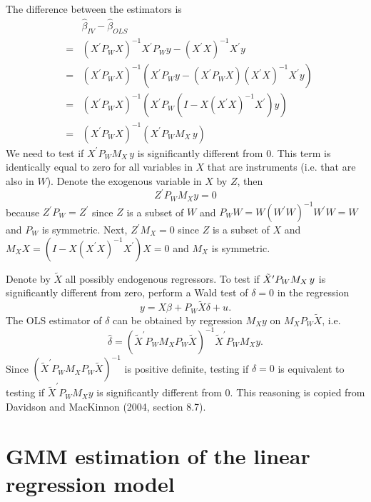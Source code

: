 \documentclass{article}
\begin{document}
The difference between the estimators is%
\begin{eqnarray*}
&&\hat{\beta}_{IV}-\hat{\beta}_{OLS} \\
&=&\left( X^{\prime }P_{W}X\right) ^{-1}X^{\prime }P_{W}y-\left( X^{\prime
}X\right) ^{-1}X^{\prime }y \\
&=&\left( X^{\prime }P_{W}X\right) ^{-1}\left( X^{\prime }P_{W}y-\left(
X^{\prime }P_{W}X\right) \left( X^{\prime }X\right) ^{-1}X^{\prime }y\right)
\\
&=&\left( X^{\prime }P_{W}X\right) ^{-1}\left( X^{\prime }P_{W}\left(
I-X\left( X^{\prime }X\right) ^{-1}X^{\prime }\right) y\right) \\
&=&\left( X^{\prime }P_{W}X\right) ^{-1}\left( X^{\prime
}P_{W}M_{X}\,y\right)
\end{eqnarray*}%
We need to test if $X^{\prime }P_{W}M_{X}\,y$ is significantly different
from 0. This term is identically equal to zero for all variables in $X$ that
are instruments (i.e. that are also in $W$). Denote the exogenous variable
in $X$ by $Z$, then%
\begin{equation*}
Z^{\prime }P_{W}M_{X}y=0
\end{equation*}%
because $Z^{\prime }P_{W}=Z^{\prime }$ since $Z$ is a subset of $W$ and $%
P_{W}W=W\left( W^{\prime }W\right) ^{-1}W^{\prime }W=W$ and $P_{W}$ is
symmetric. Next, $Z^{\prime }M_{X}=0$ since $Z$ is a subset of $X$ and $%
M_{X}X=\left( I-X\left( X^{\prime }X\right) ^{-1}X^{\prime }\right) X=0$ and
$M_{X}$ is symmetric.

Denote by $\tilde{X}$ all possibly endogenous regressors. To test if $\tilde{%
X}^{\prime }P_{W}M_{X}\,y$ is significantly different from zero, perform a
Wald test of $\delta =0$ in the regression%
\begin{equation*}
y=X\beta +P_{W}\tilde{X}\delta +u.
\end{equation*}%
The OLS estimator of $\delta $ can be obtained by regression $M_{X}y$ on $%
M_{X}P_{W}\tilde{X}$, i.e.%
\begin{equation*}
\hat{\delta}=\left( \tilde{X}^{\prime }P_{W}M_{X}P_{W}\tilde{X}\right) ^{-1}%
\tilde{X}^{\prime }P_{W}M_{X}y.
\end{equation*}%
Since $\left( \tilde{X}^{\prime }P_{W}M_{X}P_{W}\tilde{X}\right) ^{-1}$ is
positive definite, testing if $\delta =0$ is equivalent to testing if $%
\tilde{X}^{\prime }P_{W}M_{X}y$ is significantly different from 0. This
reasoning is copied from Davidson and MacKinnon (2004, section 8.7).

\section{GMM estimation of the linear regression model}
\end{document}
